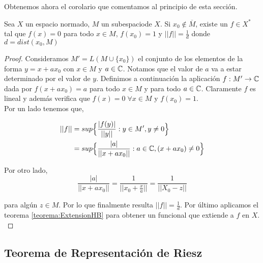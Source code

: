     Obtenemos ahora el corolario que comentamos al principio de esta sección.
    
    \begin{corolario}\label{corolario:Hanh-Banach}
    Sea $X$ un espacio normado, $M$ un subespaciode $X$. Si $x_0 \not\in \overline{M}$, existe un $f \in X^*$ tal que $f(x) = 0$ para todo $ x \in M$, $f(x_0) = 1$ y $||f|| = \frac{1}{d}$ donde $d=dist(x_0,M)$
    \end{corolario}
    
    \begin{proof}
    Consideramos $M' = L(M \cup \{x_0\})$ el conjunto de los elementos de la forma $y = x + a x_0$ con $ x \in M$ y $a \in \mathbb{C}$. Notamos que el valor de $a$ va a estar determinado por el valor de $y$. Definimos a continuación la aplicación $f:M' \to \mathbb{C}$ dada por $f(x + a x_0) = a$ para todo $x \in M$ y para todo $a \in \mathbb{C}$. Claramente $f$ es lineal y además verifica que $f(x) = 0 \; \forall x \in M$ y $f(x_0) = 1$. \\
    
    \noindent Por un lado tenemos que,
    
    \begin{equation}
        \begin{aligned}
            ||f|| & = sup \Big\{ \frac{|f(y)|}{||y||}: y \in M', y \not= 0 \Big\}\\
            & = sup \Big\{ \frac{|a|}{|| x + a x_0||}: a \in \mathbb{C}, (x + a x_0) \not= 0 \Big\}
        \end{aligned}
    \end{equation}
    
    \noindent Por otro lado,
    \begin{equation}
        \frac{|a|}{|| x + ax_0 ||} = \frac{1}{||x_0 + \frac{x}{a}||} = \frac{1}{|| X_0 - z ||}
    \end{equation}
    
    \noindent para algún $z \in M$. Por lo que finalmente resulta $||f|| = \frac{1}{d}$. Por último aplicamos el teorema \ref{teorema:ExtensionHB} para obtener un funcional que extiende a $f$ en $X$. \\
    
    \end{proof}
    
    
    \subsection{Teorema de Representación de Riesz}
    
